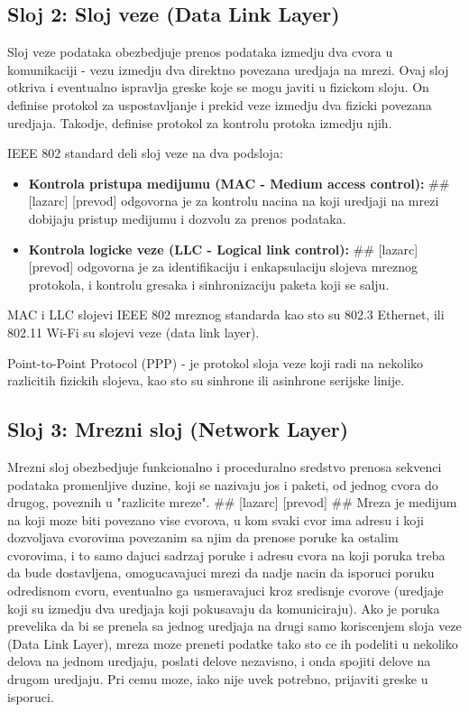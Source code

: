 \documentclass[a4paper,12pt, master]{etf}
\begin{document}
	\subsection{Sloj 2: Sloj veze (Data Link Layer)}

	Sloj veze podataka obezbedjuje prenos podataka izmedju dva cvora u komunikaciji - vezu 
	izmedju dva direktno povezana uredjaja na mrezi. Ovaj sloj otkriva i eventualno ispravlja 
	greske koje se mogu javiti u fizickom sloju. On definise protokol za uspostavljanje i 
	prekid veze izmedju dva fizicki povezana uredjaja. Takodje, definise protokol za kontrolu 
	protoka izmedju njih.

	IEEE 802 standard deli sloj veze na dva podsloja:
	\begin{itemize}
		\item \textbf{Kontrola pristupa medijumu (MAC - Medium access control):}
		\#\# [lazarc] [prevod]
		odgovorna je za kontrolu nacina na koji uredjaji na mrezi dobijaju pristup medijumu i
		dozvolu za prenos podataka.
		\item \textbf{Kontrola logicke veze (LLC - Logical link control):}
		\#\# [lazarc] [prevod]
		odgovorna je za identifikaciju i enkapsulaciju slojeva mreznog protokola, i kontrolu
		gresaka i sinhronizaciju paketa koji se salju.
	\end{itemize}

	MAC i LLC slojevi IEEE 802 mreznog standarda kao sto su 802.3 Ethernet, ili 802.11 Wi-Fi su
	slojevi veze (data link layer).

	Point-to-Point Protocol (PPP) - je protokol sloja veze koji radi na nekoliko razlicitih
	fizickih slojeva, kao sto su sinhrone ili asinhrone serijske linije.

	\subsection{Sloj 3: Mrezni sloj (Network Layer)}

	Mrezni sloj obezbedjuje funkcionalno i proceduralno sredstvo prenosa sekvenci podataka
	promenljive duzine, koji se nazivaju jos i paketi, od jednog cvora do drugog, poveznih u
	"razlicite mreze". \#\# [lazarc] [prevod] \#\# Mreza je medijum na koji moze biti povezano 
	vise cvorova, u kom svaki cvor ima adresu i koji dozvoljava cvorovima povezanim sa njim da 
	prenose poruke ka ostalim cvorovima, i to samo dajuci sadrzaj poruke i adresu cvora na 
	koji poruka treba da bude dostavljena, omogucavajuci mrezi da nadje nacin da isporuci 
	poruku odredisnom cvoru, eventualno ga usmeravajuci kroz sredisnje cvorove (uredjaje koji 
	su izmedju dva uredjaja koji pokusavaju da komuniciraju). Ako je poruka prevelika da bi se 
	prenela sa jednog uredjaja na drugi samo koriscenjem sloja veze (Data Link Layer), mreza 
	moze preneti podatke tako sto ce ih podeliti u nekoliko delova na jednom uredjaju, poslati 
	delove nezavisno, i onda spojiti delove na drugom uredjaju. Pri cemu moze, iako nije uvek 
	potrebno, prijaviti greske u isporuci.
\end{document}
